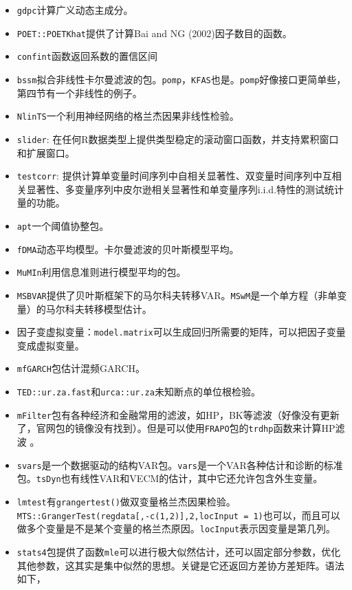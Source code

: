 \documentclass[
]{book}
\providecommand{\tightlist}{%
  \setlength{\itemsep}{0pt}\setlength{\parskip}{0pt}}
\begin{document}
\begin{itemize}
\tightlist
\item
  \texttt{gdpc}计算广义动态主成分。
\item
  \texttt{POET::POETKhat}提供了计算Bai and NG (2002)因子数目的函数。
\item
  \texttt{confint}函数返回系数的置信区间
\item
  \texttt{bssm}拟合非线性卡尔曼滤波的包。\texttt{pomp}，\texttt{KFAS}也是。\texttt{pomp}好像接口更简单些，第四节有一个非线性的例子。
\item
  \texttt{NlinTS}一个利用神经网络的格兰杰因果非线性检验。
\item
  \texttt{slider}: 在任何R数据类型上提供类型稳定的滚动窗口函数，并支持累积窗口和扩展窗口。
\item
  \texttt{testcorr}: 提供计算单变量时间序列中自相关显著性、双变量时间序列中互相关显著性、多变量序列中皮尔逊相关显著性和单变量序列i.i.d.特性的测试统计量的功能。\\
\item
  \texttt{apt}一个阈值协整包。
\item
  \texttt{fDMA}动态平均模型。卡尔曼滤波的贝叶斯模型平均。
\item
  \texttt{MuMIn}利用信息准则进行模型平均的包。
\item
  \texttt{MSBVAR}提供了贝叶斯框架下的马尔科夫转移VAR。\texttt{MSwM}是一个单方程（非单变量）的马尔科夫转移模型估计。
\item
  因子变虚拟变量：\texttt{model.matrix}可以生成回归所需要的矩阵，可以把因子变量变成虚拟变量。
\item
  \texttt{mfGARCH}包估计混频GARCH。
\item
  \texttt{TED::ur.za.fast}和\texttt{urca::ur.za}未知断点的单位根检验。
\item
  \texttt{mFilter}包有各种经济和金融常用的滤波，如HP，BK等滤波（好像没有更新了，官网包的镜像没有找到）。但是可以使用\texttt{FRAPO}包的\texttt{trdhp}函数来计算HP滤波 。
\item
  \texttt{svars}是一个数据驱动的结构VAR包。\texttt{vars}是一个VAR各种估计和诊断的标准包。\texttt{tsDyn}也有线性VAR和VECM的估计，其中它还允许包含外生变量。
\item
  \texttt{lmtest}有\texttt{grangertest()}做双变量格兰杰因果检验。\texttt{MTS::GrangerTest(regdata{[},-c(1,2){]},2,locInput\ =\ 1)}也可以，而且可以做多个变量是不是某个变量的格兰杰原因。\texttt{locInput}表示因变量是第几列。
\item
  \texttt{stats4}包提供了函数\texttt{mle}可以进行极大似然估计，还可以固定部分参数，优化其他参数，这其实是集中似然的思想。关键是它还返回方差协方差矩阵。语法如下，
\end{itemize}
\end{document}
